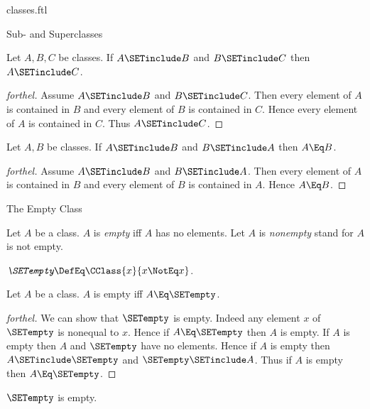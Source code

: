 \documentclass{stex}
\begin{document}
\begin{smodule}{classes.ftl}
\begin{sfragment}{Sub- and Superclasses}
  \begin{proposition}[forthel]
    Let $A, B, C$ be classes.
    If $A \SETinclude B$ and $B \SETinclude C$ then $A \SETinclude C$.
  \end{proposition}
  \begin{proof}[forthel]
    Assume $A \SETinclude B$ and $B \SETinclude C$.
    Then every element of $A$ is contained in $B$ and every element of $B$ is contained in $C$.
    Hence every element of $A$ is contained in $C$.
    Thus $A \SETinclude C$.
  \end{proof}

  \begin{proposition}[forthel]
    Let $A, B$ be classes.
    If $A \SETinclude B$ and $B \SETinclude A$ then $A \Eq B$.
  \end{proposition}
  \begin{proof}[forthel]
    Assume $A \SETinclude B$ and $B \SETinclude A$.
    Then every element of $A$ is contained in $B$ and every element of $B$ is contained in $A$.
    Hence $A \Eq B$.
  \end{proof}
\end{sfragment}

\begin{sfragment}{The Empty Class}
  \begin{definition}[forthel,for={empty,nonempty}]
    Let $A$ be a class.
    $A$ is \emph{empty} iff $A$ has no elements.
    Let $A$ is \emph{nonempty} stand for $A$ is not empty.
  \end{definition}

  \begin{definition}[forthel,for=SETempty]
    $\emph{\SETempty} \DefEq \CClass{x}{x \NotEq x}$.
  \end{definition}

  \begin{proposition}[forthel]
    Let $A$ be a class.
    $A$ is empty iff $A \Eq \SETempty$.
  \end{proposition}
  \begin{proof}[forthel]
    We can show that $\SETempty$ is empty.
    Indeed any element $x$ of $\SETempty$ is nonequal to $x$.
    Hence if $A \Eq \SETempty$ then $A$ is empty.
    If $A$ is empty then $A$ and $\SETempty$ have no elements.
    Hence if $A$ is empty then $A \SETinclude \SETempty$ and $\SETempty \SETinclude A$.
    Thus if $A$ is empty then $A \Eq \SETempty$.
  \end{proof}

  \begin{corollary}[forthel]
    $\SETempty$ is empty.
  \end{corollary}


\end{sfragment}
\end{smodule}
\end{document}

